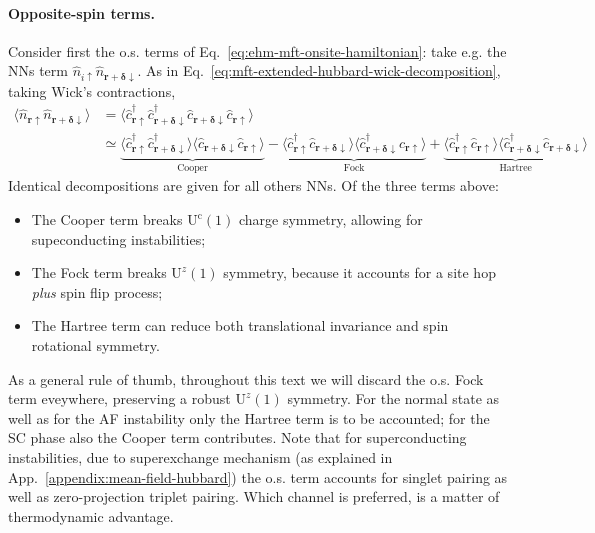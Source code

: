 {\paragraph{Opposite-spin terms.}

Consider first the o.s. terms of Eq.~\eqref{eq:ehm-mft-onsite-hamiltonian}: take e.g. the NNs term $\hat n_{i\uparrow} \hat n_{\mathbf{r} + \bm{\delta} \downarrow}$. As in Eq.~\eqref{eq:mft-extended-hubbard-wick-decomposition}, taking Wick's contractions,
\[
\begin{aligned}
	\langle 
	\hat n_{\mathbf{r}\uparrow} \hat n_{\mathbf{r} + \bm{\delta} \downarrow}
	\rangle &= \langle
	\hat c_{\mathbf{r}\uparrow}^\dagger \hat c_{\mathbf{r} + \bm{\delta} \downarrow}^\dagger \hat c_{\mathbf{r} + \bm{\delta} \downarrow} \hat c_{\mathbf{r}\uparrow}
	\rangle \\
	&\simeq
	\underbrace{
		\langle 
		\hat c_{\mathbf{r}\uparrow}^\dagger \hat c_{\mathbf{r} + \bm{\delta} \downarrow}^\dagger
		\rangle \langle	
		\hat c_{\mathbf{r} + \bm{\delta} \downarrow} \hat c_{\mathbf{r}\uparrow}
		\rangle 
	}_{\text{Cooper}}
	- 
	\underbrace{
		\langle 
		\hat c_{\mathbf{r}\uparrow}^\dagger \hat c_{\mathbf{r} + \bm{\delta} \downarrow}
		\rangle \langle	
		\hat c_{\mathbf{r} + \bm{\delta} \downarrow}^\dagger \hat c_{\mathbf{r}\uparrow}
		\rangle 
	}_{\text{Fock}}
	+ 
	\underbrace{
		\langle 
		\hat c_{\mathbf{r}\uparrow}^\dagger \hat c_{\mathbf{r}\uparrow}
		\rangle \langle	
		\hat c_{\mathbf{r} + \bm{\delta} \downarrow}^\dagger \hat c_{\mathbf{r} + \bm{\delta} \downarrow}
		\rangle
	}_{\text{Hartree}}
\end{aligned}
\]
Identical decompositions are given for all others NNs. Of the three terms above:
\begin{itemize}
	\item The Cooper term breaks $\mathrm{U}^\mathrm{c}(1)$ charge symmetry, allowing for supeconducting instabilities;
	\item The Fock term breaks $\mathrm{U}^z(1)$ symmetry, because it accounts for a site hop \textit{plus} spin flip process;
	\item The Hartree term can reduce both translational invariance and spin rotational symmetry.
\end{itemize}
As a general rule of thumb, throughout this text we will discard the o.s. Fock term eveywhere, preserving a robust $\mathrm{U}^z(1)$ symmetry. For the normal state as well as for the AF instability only the Hartree term is to be accounted; for the SC phase also the Cooper term contributes. Note that for superconducting instabilities, due to superexchange mechanism (as explained in App.~\ref{appendix:mean-field-hubbard}) the o.s. term accounts for singlet pairing as well as zero-projection triplet pairing. Which channel is preferred, is a matter of thermodynamic advantage.

}
